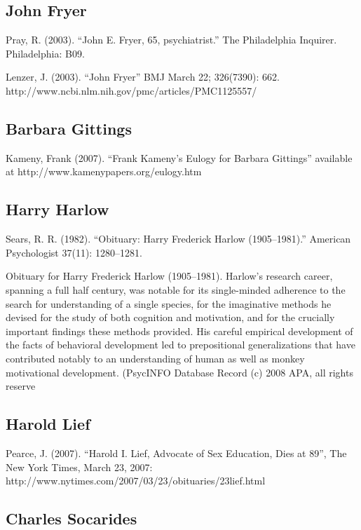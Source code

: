 \subsection{John Fryer}
\label{johnfryer}

Pray, R. (2003). “John E. Fryer, 65, psychiatrist.” The Philadelphia Inquirer. Philadelphia: B09.

Lenzer, J. (2003). “John Fryer” BMJ March 22; 326(7390): 662. http:\slash \slash www.ncbi.nlm.nih.gov\slash pmc\slash articles\slash PMC1125557\slash  

\subsection{Barbara Gittings}
\label{barbaragittings}

Kameny, Frank (2007). “Frank Kameny's Eulogy for Barbara Gittings” available at http:\slash \slash www.kamenypapers.org\slash eulogy.htm

\subsection{Harry Harlow}
\label{harryharlow}

Sears, R. R. (1982). ``Obituary: Harry Frederick Harlow (1905--1981).'' American Psychologist 37(11): 1280--1281. 

Obituary for Harry Frederick Harlow (1905--1981). Harlow's research career, spanning a full half century, was notable for its single-minded adherence to the search for understanding of a single species, for the imaginative methods he devised for the study of both cognition and motivation, and for the crucially important findings these methods provided. His careful empirical development of the facts of behavioral development led to prepositional generalizations that have contributed notably to an understanding of human as well as monkey motivational development. (PsycINFO Database Record (c) 2008 APA, all rights reserve 

\subsection{Harold Lief}
\label{haroldlief}

Pearce, J. (2007). “Harold I. Lief, Advocate of Sex Education, Dies at 89”, The New York Times, March 23, 2007: http:\slash \slash www.nytimes.com\slash 2007\slash 03\slash 23\slash obituaries\slash 23lief.html 

\subsection{Charles Socarides}
\label{charlessocarides}

